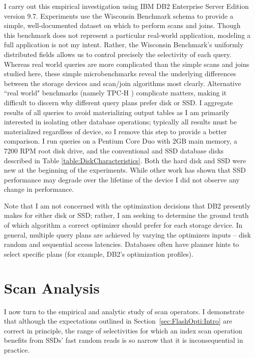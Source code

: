 I carry out this empirical investigation using IBM DB2 Enterprise Server Edition version 9.7.
Experiments use the Wisconsin Benchmark schema \cite{Bitton83benchmarkingdatabase} to provide a simple, well-documented dataset on which to perform scans and joins.
Though this benchmark does not represent a particular real-world application, modeling a full application is not my intent.
Rather, the Wisconsin Benchmark's uniformly distributed fields allows us to control precisely the selectivity of each query.
Whereas real world queries are more complicated than the simple scans and joins studied here, these simple microbenchmarks reveal the underlying differences between the storage devices and scan/join algorithms most clearly.
Alternative ``real world" benchmarks (namely TPC-H \cite{TPCH}) complicate matters, making it difficult to discern why different query plans prefer disk or SSD.
I aggregate results of all queries to avoid materializing output tables as I am primarily interested in isolating other database operations; typically all results must be materialized regardless of device, so I remove this step to provide a better comparison.
I run queries on a Pentium Core Duo with 2GB main memory, a 7200 RPM root disk drive, and the conventional and SSD database disks described in Table \ref{table:DiskCharacteristics}.
Both the hard disk and SSD were new at the beginning of the experiments.
While other work has shown that SSD performance may degrade over the lifetime of the device I did not observe any change in performance.

Note that I am not concerned with the optimization decisions that DB2 presently makes for either disk or SSD; rather, I am seeking to determine the ground truth of which algorithm a correct optimizer should prefer for each storage device. 
In general, multiple query plans are achieved by varying the optimizers inputs -- disk random and sequential access latencies.
Databases often have planner hints to select specific plans (for example, DB2's optimization profiles).

\section{Scan Analysis}
\label{sec:FlashOpti:Scans}

I now turn to the empirical and analytic study of scan operators.
I demonstrate that although the expectations outlined in Section~\ref{sec:FlashOpti:Intro} are correct in principle, the range of selectivities for which an index scan operation benefits from SSDs' fast random reads is so narrow that it is inconsequential in practice.


